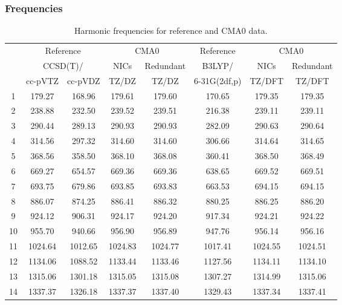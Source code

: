 \documentclass[10pt,oneside]{article}
\begin{document}
\begin{table}[h!]
\subsubsection*{Frequencies}
\centering
\caption{Harmonic frequencies for reference and CMA0 data.}
\begin{tabular}{cccccccc}
\toprule
{} & \multicolumn{2}{c}{Reference} & \multicolumn{2}{c}{CMA0} &    Reference & \multicolumn{2}{c}{CMA0} \\
{} & \multicolumn{2}{c}{CCSD(T)/} &    NICs &  Redundant &       B3LYP/ &    NICs & Redundant \\
{} &   cc-pVTZ & cc-pVDZ &   TZ/DZ &      TZ/DZ & 6-31G(2df,p) &  TZ/DFT &    TZ/DFT \\
\midrule
1  &    179.27 &  168.96 &  179.61 &     179.60 &       170.65 &  179.35 &    179.35 \\
2  &    238.88 &  232.50 &  239.52 &     239.51 &       216.38 &  239.11 &    239.11 \\
3  &    290.44 &  289.13 &  290.93 &     290.93 &       282.09 &  290.63 &    290.64 \\
4  &    314.56 &  297.32 &  314.60 &     314.60 &       306.66 &  314.64 &    314.65 \\
5  &    368.56 &  358.50 &  368.10 &     368.08 &       360.41 &  368.50 &    368.49 \\
6  &    669.27 &  654.57 &  669.36 &     669.36 &       638.65 &  669.52 &    669.51 \\
7  &    693.75 &  679.86 &  693.85 &     693.83 &       663.53 &  694.15 &    694.15 \\
8  &    886.07 &  874.25 &  886.41 &     886.32 &       880.25 &  886.25 &    886.20 \\
9  &    924.12 &  906.31 &  924.17 &     924.20 &       917.34 &  924.21 &    924.22 \\
10 &    955.70 &  940.66 &  956.90 &     956.89 &       947.76 &  956.14 &    956.16 \\
11 &   1024.64 & 1012.65 & 1024.83 &    1024.77 &      1017.41 & 1024.55 &   1024.51 \\
12 &   1134.06 & 1088.52 & 1133.44 &    1133.46 &      1127.56 & 1134.11 &   1134.10 \\
13 &   1315.06 & 1301.18 & 1315.05 &    1315.08 &      1307.27 & 1314.99 &   1315.06 \\
14 &   1337.37 & 1326.18 & 1337.37 &    1337.40 &      1329.43 & 1337.34 &   1337.41 \\

\end{tabular}
\end{table}
\end{document}
